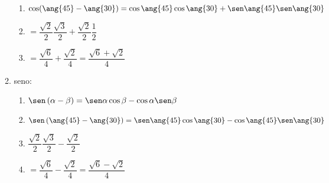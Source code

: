 \begin{table}[H]
\begin{enumerate}
\begin{enumerate}
\begin{enumerate}
			\item $\cos(\ang{45}-\ang{30})=\cos\ang{45}\cos\ang{30}+\sen\ang{45}\sen\ang{30}$
			\item $=\dfrac{\sqrt{2}}{2}\dfrac{\sqrt{3}}{2}+\dfrac{\sqrt{2}}{2}\dfrac{1}{2}$
			\item $=\dfrac{\sqrt{6}}{4}+\dfrac{\sqrt{2}}{4}=\dfrac{\sqrt{6}+\sqrt{2}}{4}$
		\end{enumerate}
		\item seno:
		\begin{enumerate}
			\item $\sen\left(\alpha-\beta\right)=\sen\alpha\cos\beta-\cos\alpha\sen\beta$
			\item $\sen\left(\ang{45}-\ang{30}\right)=\sen\ang{45} \cos\ang{30}-\cos\ang{45}\sen\ang{30} $
			\item $\dfrac{\sqrt{2}}{2}\dfrac{\sqrt{3}}{2}-\dfrac{\sqrt{2}}{2}$
			\item $=\dfrac{\sqrt{6}}{4}-\dfrac{\sqrt{2}}{4}=\dfrac{\sqrt{6}-\sqrt{2}}{4}$
		\end{enumerate}
	\end{enumerate}
\end{enumerate}
\end{table}